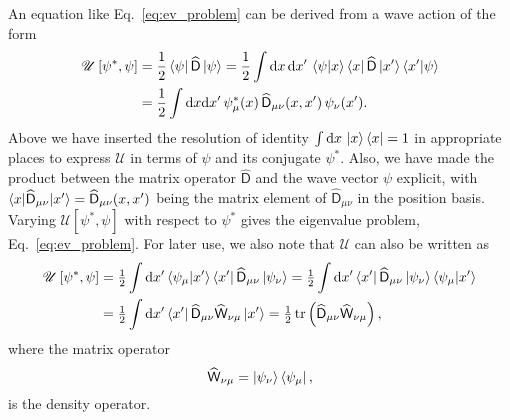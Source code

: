 An equation like Eq.~\eqref{eq:ev_problem} can be derived from a wave action of the form
%
\begin{equation}
  \begin{aligned}
    \mathscr{U}\left[\psi^{*}, \psi\right] &= \frac{1}{2}\mathinner{\langle{\psi}\rvert}\widehat{\mathsf{D}}\mathinner{\lvert{\psi}\rangle}
  = \frac{1}{2}\int \mathrm{d}{x}\,\mathrm{d}{x'}\, \mathinner{\langle{\psi|x}\rangle}\mathinner{\langle{x}\rvert}\widehat{\mathsf{D}}\mathinner{\lvert{x'}\rangle}\mathinner{\langle{x'|\psi}\rangle}\\
                                           &= \frac{1}{2}\int \mathrm{d}{x}\mathrm{d}{x'}\, \psi^{*}_{\mu}(x)\,\widehat{\mathsf{D}}_{\mu\nu}(x, x')\,\psi_{\nu}(x').
  \label{eq:wave_action}
  \end{aligned}
\end{equation}
%
Above we have inserted the resolution of identity $\int \mathrm{d}{x}\,\mathinner{\lvert{x}\rangle}\mathinner{\langle{x}\rvert} = 1$ in appropriate places to express $\mathscr{U}$ in terms of $\psi$ and its conjugate $\psi^{*}$.
Also, we have made the product between the matrix operator $\widehat{\mathsf{D}}$ and the wave vector $\psi$ explicit, with $\mathinner{\langle{x|\widehat{\mathsf{D}}_{\mu\nu}|x'}\rangle} = \widehat{\mathsf{D}}_{\mu\nu}(x, x')$ being the matrix element of $\widehat{\mathsf{D}}_{\mu\nu}$ in the position basis.
Varying $\mathscr{U}[\psi^{*}, \psi]$ with respect to $\psi^{*}$ gives the eigenvalue problem, Eq.~\eqref{eq:ev_problem}.
For later use, we also note that $\mathscr{U}$ can also be written as
%
\begin{equation}
  \begin{aligned}
    \mathscr{U}\left[\psi^{*}, \psi\right] &= \tfrac{1}{2}\int \mathrm{d}{x}' \mathinner{\langle{\psi_{\mu}|x'}\rangle}\mathinner{\langle{x'}\rvert}\widehat{\mathsf{D}}_{\mu\nu}\mathinner{\lvert{\psi_{\nu}}\rangle}
= \tfrac{1}{2}\int \mathrm{d}{x}' \mathinner{\langle{x'}\rvert}\widehat{\mathsf{D}}_{\mu\nu}\mathinner{\lvert{\psi_{\nu}}\rangle} \mathinner{\langle{\psi_{\mu}|x'}\rangle}\\
&= \tfrac{1}{2}\int \mathrm{d}{x}' \mathinner{\langle{x'}\rvert}\widehat{\mathsf{D}}_{\mu\nu}\widehat{\mathsf{W}}_{\nu\mu}\mathinner{\lvert{x'}\rangle} = \tfrac{1}{2}\operatorname{tr}\left(\widehat{\mathsf{D}}_{\mu\nu}\widehat{\mathsf{W}}_{\nu\mu}\right),
  \label{eq:wave_action_trace_form}
  \end{aligned}
\end{equation}
%
where the matrix operator
%
\begin{equation}
  \widehat{\mathsf{W}}_{\nu\mu} = \mathinner{\lvert{\psi_{\nu}}\rangle}\mathinner{\langle{\psi_{\mu}}\rvert},
\end{equation}
%
is the density operator.

